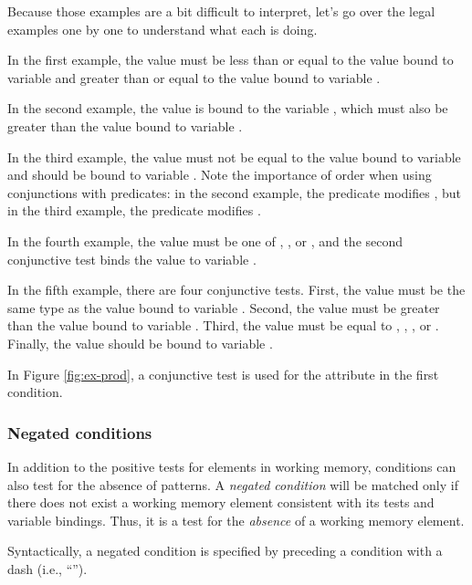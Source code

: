 Because those examples are a bit difficult to interpret, let's go over the
legal examples one by one to understand what each is doing.

In the first example, the value must be less than or equal to the value bound
to variable  and greater than or equal to the value bound to
variable .

In the second example, the value is bound to the variable , which
must also be greater than the value bound to variable . 

In the third example, the value must not be equal to the value bound to
variable  and should be bound to variable .  Note the
importance of order when using conjunctions with predicates: in the second
example, the predicate modifies , but in the third
example, the predicate modifies .

In the fourth example, the value must be one of , , or
, and the second conjunctive test binds the value to variable
. 

In the fifth example, there are four conjunctive tests. First, the value must
be the same type as the value bound to variable . Second, the value
must be greater than the value bound to variable . Third, the value
must be equal to , , , or . Finally, the value
should be bound to variable .

In Figure \ref{fig:ex-prod}, a conjunctive test is used for the 
attribute in the first condition.

\subsubsection{Negated conditions}
\label{SYNTAX-pm-negated}       %
\index{-}

In addition to the positive tests for elements in working memory, conditions
can also test for the absence of patterns.  A \emph{negated condition} will be
matched only if there does not exist a working memory element consistent with
its tests and variable bindings. Thus, it is a test for the \textit{absence}
of a working memory element.

Syntactically, a negated condition is specified by preceding a condition with a
dash (i.e., ``\soar{-}'').

